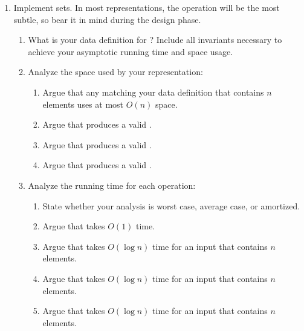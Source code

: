 \documentclass{article}
\begin{document}
\begin{enumerate}
\item Implement sets.  In most representations, the  operation
  will be the most subtle, so bear it in mind during the design phase.
  \begin{enumerate}
  \item What is your data definition for \Set{}?  Include all invariants
    necessary to achieve your asymptotic running time and space usage.
  \item Analyze the space used by your representation:
    \begin{enumerate}
    \item Argue that any \Set{} matching your data definition that contains
      \(n\) elements uses at most \(O(n)\) space.
    \item Argue that  produces a valid \Set{}.
    \item Argue that  produces a valid \Set{}.
    \item Argue that  produces a valid \Set{}.
    \end{enumerate}
  \item Analyze the running time for each operation:
    \begin{enumerate}
    \item State whether your analysis is worst case, average case, or
      amortized.
    \item Argue that  takes \(O(1)\) time.
    \item Argue that  takes \(O(\log n)\) time for an
      input that contains \(n\) elements.
    \item Argue that  takes \(O(\log n)\) time for an
      input that contains \(n\) elements.
    \item Argue that  takes \(O(\log n)\) time for an
      input that contains \(n\) elements.
    \end{enumerate}
  \end{enumerate}


\end{enumerate}
\end{document}
